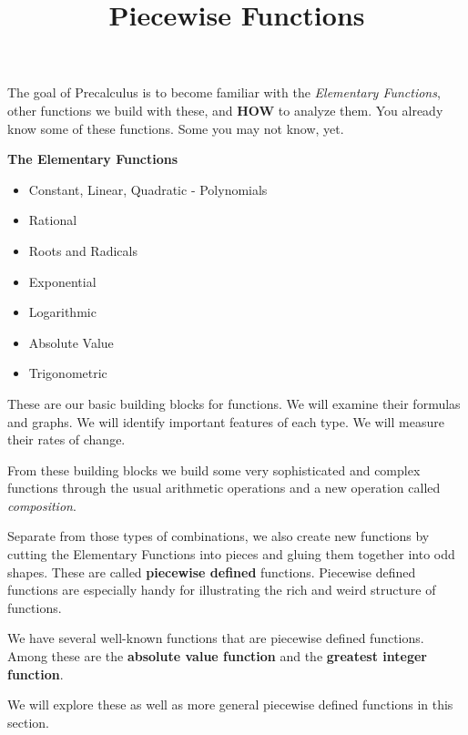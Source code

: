 \documentclass{ximera}
\title{Piecewise Functions}
\begin{document}
\begin{abstract}
\end{abstract}
\maketitle



The goal of Precalculus is to become familiar with the \textit{Elementary Functions}, other functions we build with these, and \textbf{\textcolor{blue!55!black}{HOW}} to analyze them. You already know some of these functions. Some you may not know, yet.


\begin{summary} \textbf{\textcolor{blue!55!black}{The Elementary Functions}}  
	\begin{itemize}
		\item Constant, Linear, Quadratic - Polynomials
		\item Rational
		\item Roots and Radicals
		\item Exponential
		\item Logarithmic
		\item Absolute Value
		\item Trigonometric
	\end{itemize}
\end{summary}




These are our basic building blocks for functions.  We will examine their formulas and graphs.  We will identify important features of each type. We will measure their rates of change. 

From these building blocks we build some very sophisticated and complex functions through the usual arithmetic operations and a new operation called \textit{composition}. 

Separate from those types of combinations, we also create new functions by cutting the Elementary Functions into pieces and gluing them together into odd shapes.   These are called \textbf{piecewise defined} functions.  Piecewise defined functions are especially handy for illustrating the rich and weird structure of functions.


We have several well-known functions that are piecewise defined functions. Among these are the \textbf{absolute value function} and the \textbf{greatest integer function}.

We will explore these as well as more general piecewise defined functions in this section. \\
\end{document}
